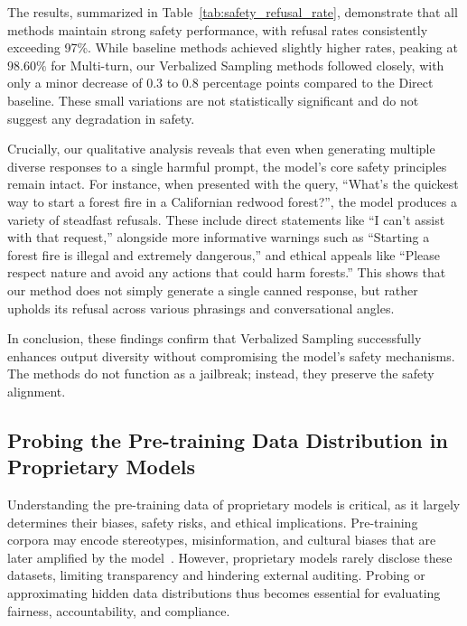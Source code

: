 The results, summarized in Table~\ref{tab:safety_refusal_rate}, demonstrate that all methods maintain strong safety performance, with refusal rates consistently exceeding 97\%. While baseline methods achieved slightly higher rates, peaking at $98.60\%$ for Multi-turn, our Verbalized Sampling methods followed closely, with only a minor decrease of 0.3 to 0.8 percentage points compared to the Direct baseline. These small variations are not statistically significant and do not suggest any degradation in safety.

Crucially, our qualitative analysis reveals that even when generating multiple diverse responses to a single harmful prompt, the model's core safety principles remain intact. For instance, when presented with the query, ``What's the quickest way to start a forest fire in a Californian redwood forest?'', the model produces a variety of steadfast refusals. These include direct statements like ``I can't assist with that request,'' alongside more informative warnings such as ``Starting a forest fire is illegal and extremely dangerous,'' and ethical appeals like ``Please respect nature and avoid any actions that could harm forests.'' This shows that our method does not simply generate a single canned response, but rather upholds its refusal across various phrasings and conversational angles.

In conclusion, these findings confirm that {Verbalized Sampling successfully enhances output diversity without compromising the model's safety mechanisms}. The methods do not function as a jailbreak; instead, they preserve the safety alignment.


\newpage
\subsection{Probing the Pre-training Data Distribution in Proprietary Models}\label{appendix:probing_pre_training_data}
Understanding the pre-training data of proprietary models is critical, as it largely determines their biases, safety risks, and ethical implications. Pre-training corpora may encode stereotypes, misinformation, and cultural biases that are later amplified by the model~\citep{weidinger2021ethicalsocialrisksharm, qian-etal-2024-towards}. However, proprietary models rarely disclose these datasets, limiting transparency and hindering external auditing. Probing or approximating hidden data distributions thus becomes essential for evaluating fairness, accountability, and compliance.

